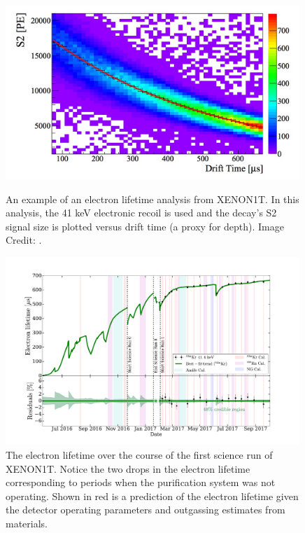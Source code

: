 \begin{figure}[p]
	\centering
	\includegraphics[width=0.99\textwidth]{../../Chapter2/images/tpc_electron_lifetime.jpeg}
	\caption{An example of an electron lifetime analysis from XENON1T.  In this analysis, the 41 keV  electronic recoil is used and the decay's S2 signal size is plotted versus drift time (a proxy for depth).  Image Credit: .}
	\label{fig:xe1t_electron_lifetime}
	
	\centering
	\includegraphics[width=0.99\textwidth]{xe1t_electron_lifetime_full}
	\caption{The electron lifetime over the course of the first science run of XENON1T.  Notice the two drops in the electron lifetime corresponding to periods when the purification system was not operating.  Shown in red is a prediction of the electron lifetime given the detector operating parameters and outgassing estimates from materials.}
	\label{fig:xe1t_electron_lifetime_sr0}
\end{figure}


